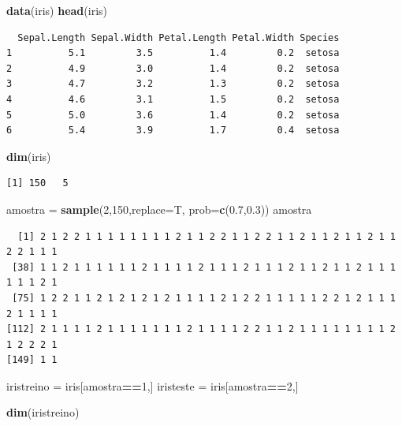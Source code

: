 \documentclass[12pt,brazil,oneside]{book}
\newenvironment{Shaded}{\begin{snugshade}}{\end{snugshade}}
\newcommand{\DataTypeTok}[1]{\textcolor[rgb]{0.13,0.29,0.53}{#1}}
\newcommand{\DecValTok}[1]{\textcolor[rgb]{0.00,0.00,0.81}{#1}}
\newcommand{\FloatTok}[1]{\textcolor[rgb]{0.00,0.00,0.81}{#1}}
\newcommand{\KeywordTok}[1]{\textcolor[rgb]{0.13,0.29,0.53}{\textbf{#1}}}
\newcommand{\NormalTok}[1]{#1}
\newcommand{\OperatorTok}[1]{\textcolor[rgb]{0.81,0.36,0.00}{\textbf{#1}}}
\newcommand{\StringTok}[1]{\textcolor[rgb]{0.31,0.60,0.02}{#1}}
\begin{document}
\begin{Shaded}
\begin{Highlighting}[]
\KeywordTok{data}\NormalTok{(iris)}
\KeywordTok{head}\NormalTok{(iris)}
\end{Highlighting}
\end{Shaded}

\begin{verbatim}
  Sepal.Length Sepal.Width Petal.Length Petal.Width Species
1          5.1         3.5          1.4         0.2  setosa
2          4.9         3.0          1.4         0.2  setosa
3          4.7         3.2          1.3         0.2  setosa
4          4.6         3.1          1.5         0.2  setosa
5          5.0         3.6          1.4         0.2  setosa
6          5.4         3.9          1.7         0.4  setosa
\end{verbatim}

\begin{Shaded}
\begin{Highlighting}[]
\KeywordTok{dim}\NormalTok{(iris)}
\end{Highlighting}
\end{Shaded}

\begin{verbatim}
[1] 150   5
\end{verbatim}

\begin{Shaded}
\begin{Highlighting}[]
\NormalTok{amostra =}\StringTok{ }\KeywordTok{sample}\NormalTok{(}\DecValTok{2}\NormalTok{,}\DecValTok{150}\NormalTok{,}\DataTypeTok{replace=}\NormalTok{T, }\DataTypeTok{prob=}\KeywordTok{c}\NormalTok{(}\FloatTok{0.7}\NormalTok{,}\FloatTok{0.3}\NormalTok{))}
\NormalTok{amostra}
\end{Highlighting}
\end{Shaded}

\begin{verbatim}
  [1] 2 1 2 2 1 1 1 1 1 1 1 1 2 1 1 2 2 1 1 2 2 1 1 2 1 1 2 1 1 2 1 1 2 2 1 1 1
 [38] 1 1 2 1 1 1 1 1 1 2 1 1 1 1 2 1 1 1 2 1 1 1 2 1 1 2 1 1 2 1 1 1 1 1 1 2 1
 [75] 1 2 2 1 1 2 1 2 1 2 1 2 1 1 1 1 2 1 2 2 1 1 1 1 1 2 2 1 2 1 1 1 2 1 1 1 1
[112] 2 1 1 1 1 2 1 1 1 1 1 1 1 2 1 1 1 1 2 2 1 1 2 1 1 1 1 1 1 1 1 2 1 2 2 2 1
[149] 1 1
\end{verbatim}

\begin{Shaded}
\begin{Highlighting}[]
\NormalTok{iristreino =}\StringTok{ }\NormalTok{iris[amostra}\OperatorTok{==}\DecValTok{1}\NormalTok{,]}
\NormalTok{iristeste =}\StringTok{ }\NormalTok{iris[amostra}\OperatorTok{==}\DecValTok{2}\NormalTok{,]}

\KeywordTok{dim}\NormalTok{(iristreino)}
\end{Highlighting}
\end{Shaded}
\end{document}
